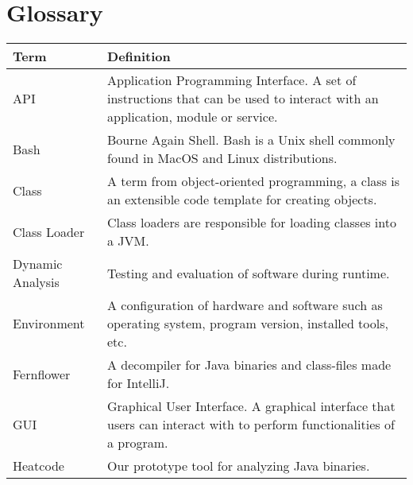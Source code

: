 \label{sec:glossary}
\section*{Glossary}
\begin{tabularx}{\linewidth}{|l|X|}
\hline
\rowcolor[HTML]{C0C0C0} 
{\color[HTML]{000000} Term} & Definition                                                                                                            \\ \hline
API &
  Application Programming Interface. A set of instructions that can be used to interact with an application, module or service. \\ \hline
\rowcolor[HTML]{CBCEFB} 
Bash                        & Bourne Again Shell. Bash is a Unix shell commonly found in MacOS and Linux distributions.                             \\ \hline
Class                       & A term from object-oriented programming, a class is an extensible code template for creating objects.                 \\ \hline
\rowcolor[HTML]{CBCEFB} 
Class Loader                & Class loaders are responsible for loading classes into a JVM.                                                         \\ \hline
Dynamic Analysis            & Testing and evaluation of software during runtime.                                                                    \\ \hline
\rowcolor[HTML]{CBCEFB} 
Environment                 & A configuration of hardware and software such as operating system, program version, installed tools, etc.             \\ \hline
Fernflower                  & A decompiler for Java binaries and class-files made for IntelliJ.                                                     \\ \hline
\rowcolor[HTML]{CBCEFB} 
GUI                         & Graphical User Interface. A graphical interface that users can interact with to perform functionalities of a program. \\ \hline
Heatcode                    & Our prototype tool for analyzing Java binaries.                                                                       \\ \hline

\end{tabularx}
